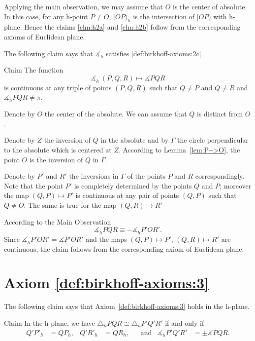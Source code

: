 Applying the main observation, 
we may assume that $O$ is the center of absolute.
In this case, for any h-point $P\ne O$,
$[OP)_h$ is the intersection of $[OP)$ with h-plane.
Hence the claims \ref{clm:h2a} and \ref{clm:h2b} 
follow from the corresponding axioms of Euclidean plane.
\qeds

The following claim says that
$\measuredangle_h$ satisfies
 \ref{def:birkhoff-axioms:2c}.

\begin{thm}{Claim}\label{clm:h2c}
The function 
$$\measuredangle_h\:(P,Q,R)\mapsto\measuredangle P Q R$$
is continuous at any triple of points $(P,Q,R)$
such that $Q\ne P$ and $Q\ne R$ and $\measuredangle_h P Q R\ne\pi$.
\end{thm}

Denote by $O$ the center of the absolute.
We can assume that $Q$ is distinct from $O$.

Denote by $Z$ the inversion of $Q$ in the absolute
and by $\Gamma$ the circle perpendicular to the absolute which is centered at $Z$.
According to Lemma~\ref{lem:P-->O},
the point $O$ is the inversion of $Q$ in $\Gamma$.

Denote by $P'$ and $R'$ the inversions in $\Gamma$ of the points $P$ and $R$ correspondingly.
Note that the point $P'$ is completely determined by the points $Q$ and $P$;
moreover the map $(Q,P)\mapsto P'$ is continuous at any pair of points $(Q,P)$ such that $Q\ne O$.
The same is true for the map $(Q,R)\mapsto R'$

According to the Main Observation 
$$\measuredangle_h P Q R\equiv -\measuredangle_h P' O R'.$$
Since $\measuredangle_h P' O R'=\measuredangle P' O R'$ and 
the maps $(Q,P)\mapsto P'$, $(Q,R)\mapsto R'$ are continuous,
the claim follows from the corresponding axiom of Euclidean plane.
\qeds

\section*{Axiom \ref{def:birkhoff-axioms:3}}

The following claim says that Axiom~\ref{def:birkhoff-axioms:3} holds in the h-plane.

\begin{thm}{Claim}
In the h-plane, we have
$\triangle_h P Q R 
\cong
\triangle_h P' Q' R'$
if and only if 
\begin{align*}
Q' P'_h&=Q P_h, & Q' R'_h&= Q R_h, &&\text{and}
&\measuredangle_h P' Q' R'&=\pm\measuredangle P Q R.
\end{align*}
 
\end{thm}

